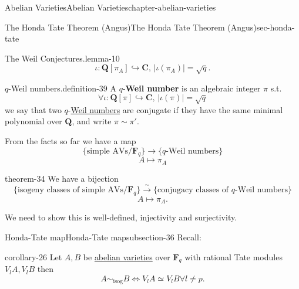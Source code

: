 \documentclass[oneside,10pt,]{book}
\newcommand{\terminology}[1]{\textbf{#1}}
\numberwithin{equation}{section}
\newcommand{\lb}{[}
\newcommand{\rb}{]}
\newcommand{\QQ}{\mathbf{Q}}
\newcommand{\CC}{\mathbf{C}}
\newcommand{\FF}{\mathbf{F}}
\begin{document}
\begin{chapterptx}{Abelian Varieties}{}{Abelian Varieties}{}{}{chapter-abelian-varieties}
\begin{sectionptx}{The Honda Tate Theorem (Angus)}{}{The Honda Tate Theorem (Angus)}{}{}{sec-honda-tate}
\begin{introduction}{}
\begin{lemma}{The Weil Conjectures.}{}{lemma-10}
\begin{equation*}
\iota \colon \QQ\lb \pi_A\rb \hookrightarrow \CC,\,|\iota(\pi_A)| = \sqrt q\text{.}
\end{equation*}
%
\end{lemma}
\begin{definition}{\(q\)-Weil numbers.}{definition-39}%
\hypertarget{p-405}{}%
A \(q\)-\terminology{Weil number} is an algebraic integer \(\pi\) s.t.%
\begin{equation*}
\forall \iota \colon \QQ\lb \pi\rb \hookrightarrow \CC,\,|\iota(\pi)| = \sqrt q
\end{equation*}
we say that two \(q\)-\hyperref[sec-honda-tate]{Weil numbers} are conjugate if they have the same minimal polynomial over \(\QQ\), and write \(\pi \sim \pi'\).%
\end{definition}
\hypertarget{p-406}{}%
From the facts so far we have a map%
\begin{equation*}
\{\text{simple AVs}/\FF_q\}\to \{q\text{-Weil numbers}\}
\end{equation*}
%
\begin{equation*}
A \mapsto \pi_A
\end{equation*}
%
\begin{theorem}{}{}{theorem-34}%
\hypertarget{p-407}{}%
We have a bijection%
\begin{equation*}
\{\text{isogeny classes of simple AVs}/\FF_q\}\xrightarrow{\sim} \{\text{conjugacy classes of }q\text{-Weil numbers}\}
\end{equation*}
%
\begin{equation*}
A \mapsto \pi_A\text{.}
\end{equation*}
%
\end{theorem}
\hypertarget{p-408}{}%
We need to show this is well-defined, injectivity and surjectivity.%
\end{introduction}%
%
%
\typeout{************************************************}
\typeout{************************************************}
%
\begin{subsectionptx}{Honda-Tate map}{}{Honda-Tate map}{}{}{subsection-36}
\hypertarget{p-409}{}%
Recall:%
\begin{corollary}{}{}{corollary-26}%
\hypertarget{p-410}{}%
Let \(A,B\) be \hyperref[def-buntes-abvar]{abelian varieties} over \(\FF_q\) with rational Tate modules \(V_l A, V_lB\) then%
\begin{equation*}
A\sim_{\text{isog}} B \iff V_l A \simeq V_l B \forall l \ne p\text{.}
\end{equation*}

\end{corollary}
\end{subsectionptx}
\end{sectionptx}
\end{chapterptx}
\end{document}
